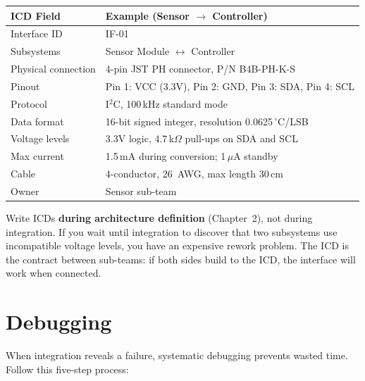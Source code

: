 \documentclass[11pt,letterpaper,twoside,openany]{book}
\newcommand{\degC}{\ensuremath{{}^{\circ}\text{C}}}
\begin{document}
\begin{center}
\small
\begin{tabularx}{\textwidth}{l X}
\toprule
\textbf{ICD Field} & \textbf{Example (Sensor $\to$ Controller)} \\
\midrule
Interface ID & IF-01 \\
Subsystems & Sensor Module $\leftrightarrow$ Controller \\
Physical connection & 4-pin JST PH connector, P/N B4B-PH-K-S \\
Pinout & Pin 1: VCC (3.3V), Pin 2: GND, Pin 3: SDA, Pin 4: SCL \\
Protocol & I$^2$C, 100\,kHz standard mode \\
Data format & 16-bit signed integer, resolution 0.0625\,\degC/LSB \\
Voltage levels & 3.3V logic, 4.7\,k$\Omega$ pull-ups on SDA and SCL \\
Max current & 1.5\,mA during conversion; 1\,$\mu$A standby \\
Cable & 4-conductor, 26~AWG, max length 30\,cm \\
Owner & Sensor sub-team \\
\bottomrule
\end{tabularx}
\end{center}

Write ICDs \textbf{during architecture definition} (Chapter~2), not during integration. If you wait until integration to discover that two subsystems use incompatible voltage levels, you have an expensive rework problem. The ICD is the contract between sub-teams: if both sides build to the ICD, the interface will work when connected.

\FloatBarrier
\section{Debugging}
When integration reveals a failure, systematic debugging prevents wasted time. Follow this five-step process:
\end{document}
